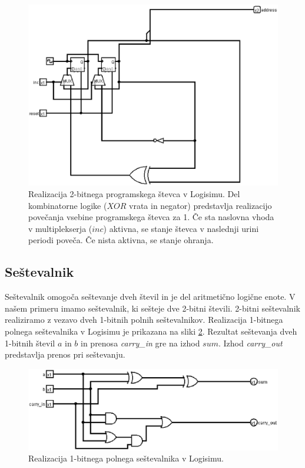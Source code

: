 \begin{figure}[htbf]%
\begin{center}
\includegraphics[width=0.75\columnwidth]{procesor/img/PC}%
\caption{Realizacija 2-bitnega programskega števca v Logisimu. Del kombinatorne logike ($XOR$ vrata in negator) predstavlja realizacijo povečanja vsebine programskega števca za 1. Če sta naslovna vhoda v multiplekserja ($inc$) aktivna, se stanje števca v naslednji urini periodi poveča. Če nista aktivna, se stanje ohranja.}%
\label{fig:pc}%
\end{center}
\end{figure}

\subsection{Seštevalnik}
Seštevalnik omogoča seštevanje dveh števil in je del aritmetično logične enote. V našem primeru imamo seštevalnik, ki sešteje dve 2-bitni števili. 2-bitni seštevalnik realiziramo z vezavo dveh 1-bitnih polnih seštevalnikov. Realizacija 1-bitnega polnega seštevalnika v Logisimu je prikazana na sliki \ref{fig:add_1bit}. Rezultat seštevanja dveh 1-bitnih števil $a$ in $b$ in prenosa \emph{carry\_in} gre na izhod $sum$. Izhod \emph{carry\_out} predstavlja prenos pri seštevanju.

\begin{figure}[htbf]%
\begin{center}
\includegraphics[width=0.75\columnwidth]{procesor/img/add_1bit}%
\caption{Realizacija 1-bitnega polnega seštevalnika v Logisimu.}%
\label{fig:add_1bit}%
\end{center}
\end{figure}

